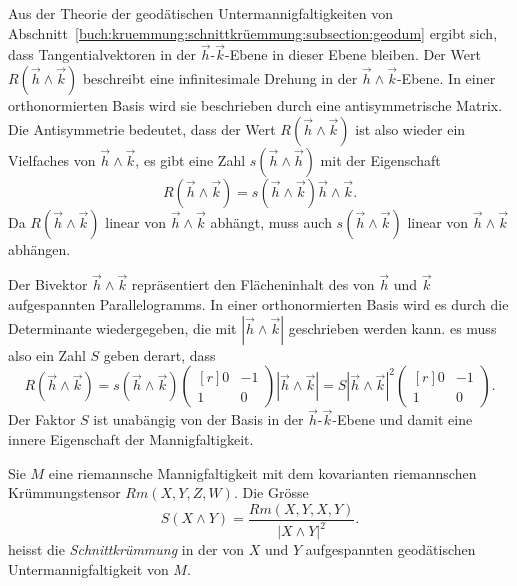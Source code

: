 Aus der Theorie der geodätischen Untermannigfaltigkeiten von
Abschnitt~\ref{buch:kruemmung:schnittkrüemmung:subsection:geodum}
ergibt sich, dass Tangentialvektoren in der $\vec{h}$-$\vec{k}$-Ebene
in dieser Ebene bleiben.
Der Wert $R(\vec{h}\wedge\vec{k})$ beschreibt eine infinitesimale Drehung
in der $\vec{h}\wedge\vec{k}$-Ebene.
In einer orthonormierten Basis wird sie beschrieben durch eine
antisymmetrische Matrix.
Die Antisymmetrie bedeutet, dass der Wert $R(\vec{h}\wedge\vec{k})$ ist
also wieder ein Vielfaches von $\vec{h}\wedge\vec{k}$, es gibt
eine Zahl $s(\vec{h}\wedge\vec{h})$ mit der Eigenschaft
\[
R(\vec{h}\wedge\vec{k})
=
s(\vec{h}\wedge\vec{k})
\vec{h}\wedge\vec{k}.
\]
Da $R(\vec{h}\wedge\vec{k})$ linear von $\vec{h}\wedge\vec{k}$ abhängt,
muss auch $s(\vec{h}\wedge\vec{k})$ linear von $\vec{h}\wedge\vec{k}$
abhängen.

Der Bivektor $\vec{h}\wedge\vec{k}$ repräsentiert den Flächeninhalt
des von $\vec{h}$ und $\vec{k}$ aufgespannten Parallelogramms. 
In einer orthonormierten Basis wird es durch die Determinante wiedergegeben,
die mit $|\vec{h}\wedge\vec{k}|$ geschrieben werden kann.
es muss also ein Zahl $S$ geben derart, dass
\[
R(\vec{h}\wedge\vec{k})
=
s(\vec{h}\wedge\vec{k})
\begin{pmatrix*}[r] 0&-1\\ 1&0\end{pmatrix*}
|\vec{h}\wedge\vec{k}|
=
S |\vec{h}\wedge\vec{k}|^2
\begin{pmatrix*}[r] 0&-1\\1&0\end{pmatrix*}.
\]
Der Faktor $S$ ist unabängig von der Basis in der $\vec{h}$-$\vec{k}$-Ebene
und damit eine innere Eigenschaft der Mannigfaltigkeit.

\begin{definition}[Schnittkrümmung]
\label{buch:kruemmung:schnittkruemmung:def:schnittkruemmung}
Sie $M$ eine riemannsche Mannigfaltigkeit mit dem kovarianten riemannschen
Krümmungstensor $Rm(X,Y,Z,W)$.
Die Grösse
\[
S(X\wedge Y) = \frac{Rm(X,Y,X,Y)}{|X\wedge Y|^2}.
\]
heisst die \emph{Schnittkrümmung} in der von $X$ und $Y$ aufgespannten
geodätischen Untermannigfaltigkeit von $M$.
%
\end{definition}


